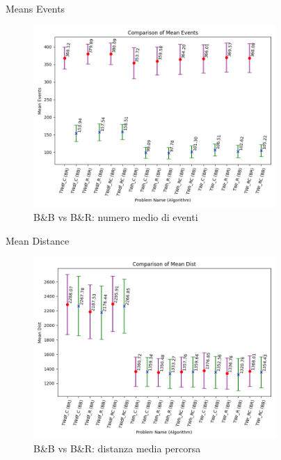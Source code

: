 \documentclass[10pt]{beamer}
\begin{document}
    \begin{frame}{Means Events}
        \begin{figure}[!h]
            \centering
            \includegraphics[width=0.82\textwidth]{Images/mean_events}
            \caption{B\&B vs B\&R: numero medio di eventi}
            \label{fig:mean_events}
        \end{figure}
    \end{frame}

    \begin{frame}{Mean Distance}
        \begin{figure}[h!]
            \centering
            \includegraphics[width=0.82\textwidth]{Images/Mean_dist.png}
            \caption{B\&B vs B\&R: distanza media percorsa}
            \label{fig:Mean_dist}
        \end{figure}
    \end{frame}
\end{document}
